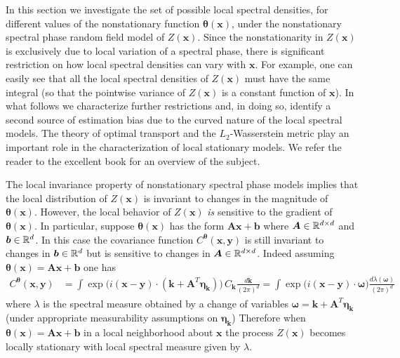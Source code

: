 \documentclass[10pt,noinfoline]{imsart}
\newcommand{\bs}{\boldsymbol}
\begin{document}
In this section we investigate the set of possible local spectral densities, for different values of the nonstationary function $\bs \theta(\bs x)$, under the nonstationary spectral phase random field model of $Z(\bs x)$. Since the nonstationarity in $Z(\bs x)$ is exclusively due to local variation of a spectral phase, there is significant restriction on how local spectral densities can vary with $\bs x$. For example, one can easily see that all the local spectral densities of $Z(\bs x)$ must have the same integral (so that the pointwise variance of $Z(\bs x)$ is a constant function of $\bs x$). In what follows we characterize further restrictions and, in doing so, identify a second source of estimation bias due to the curved nature of the local spectral models. The theory of optimal transport and the $L_2$-Wasserstein metric play an important role in the characterization of local stationary models. We refer the reader to the excellent book \cite{villani2003topics} for an overview of the subject. 



The local invariance property of nonstationary spectral phase models implies that the local distribution of $Z(\bs x)$ is invariant to changes in the magnitude of $\bs \theta(\bs x)$. However, the local behavior of $Z(\bs x)$ \textit{is} sensitive to the gradient of $\bs \theta(\bs x)$. In particular, suppose $\bs\theta(\bs x)$ has the form $\bs A \bs x + \bs b$  where $\bs A\in \Bbb R^{d\times d}$ and $\bs b \in \Bbb R^d$. In this case the covariance function $C^{\bs \theta}(\bs x,\bs y)$ is still invariant to changes in $\bs b \in \Bbb R^d$ but is sensitive to changes in $\bs A\in \Bbb R^{d\times d}$. Indeed assuming $\bs\theta(\bs x)=\bs A \bs x + \bs b$ one has
\begin{align}
C^{\bs \theta}(\bs x,\bs y)
&=\int  \exp\!\big(i(\bs x-\bs y)\!\cdot\! (\bs k + \bs A^T\bs\eta_{\bs k})\big) \, C_{\bs k}\frac{d\bs k}{(2\pi)^d}
=\int\exp\!\big(i(\bs x-\bs y)\!\cdot\! \bs\omega\big)  \frac{d\lambda(\bs \omega)}{(2\pi)^d} \label{eq: local spectral density for nonstationary phase}
\end{align} 
where $\lambda$ is the spectral measure obtained by a change of variables $\bs\omega = \bs k + \bs A^T\bs\eta_{\bs k}$ (under appropriate measurability assumptions on $\bs \eta_{\bs k}$) Therefore when $\bs\theta(\bs x) = \bs A \bs x + \bs b$ in a local neighborhood about $\bs x$ the process $Z(\bs x)$ becomes locally stationary with local spectral measure given by $\lambda$. 
\end{document}
